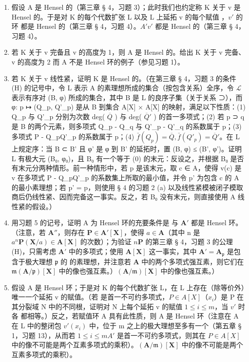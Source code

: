 \begin{enumerate}
\def\labelenumi{(\alph{enumi})}
\item
  假设 A 是 Hensel 的（第三章 § 4，习题 3）；此时我们也约定称 K 关于 v 是 Hensel 的。于是对 K 的每个代数扩张 L 以及 L 上延拓 v 的每个赋值 ，\(v'\) 的环  都是 Hensel 的（第三章 § 4，习题 4）。\(A'\)\(v'\) 都是 Hensel 的（第三章 § 4，习题 4）。
\item
  若 K 关于 v 完备且 v 的高度为 1，则 A 是 Hensel 的。给出 K 关于 v 完备、v 的高度为 2 而 A 不是 Hensel 环的例子（参见习题 1）。
\item
  若 K 关于 v 线性紧，证明 K 是 Hensel 的。（在第三章 § 4，习题 3 的条件 (H) 的记号中，令 L 表示 A 的素理想所成的集合（按包含关系）全序，令 \(\mathcal{L}\) 表示有序对 (B, φ) 所成的集合，其中 B 是 L 的良序子集（关于关系 ⊃），而 φ: p ↦ (Q\_p, Q'\_p) 是从 B 到集合 A{[}X{]} × A{[}X{]} 的映射，满足以下性质：(1) Q\_p 与 Q'\_p 分别为次数 deg( \(\overline{Q}\) ) 与 deg( \(\overline{Q}'\) ) 的首一多项式；(2) 若 p ⊃ q 是 B 的两个元素，则多项式 Q\_p - Q\_q 与 Q'\_p - Q'\_q 的系数属于 p；(3) 多项式 P - Q\_pQ'\_p 的系数属于 p；(4) \(\bar{f}(Q_{p}) = \overline{Q}, \bar{f}(Q'_{p}) = \overline{Q}'\)。在 L 上规定序：当 B ⊂ B' 且 φ' 是 φ 到 B' 的延拓时，置 (B, φ) ≤ (B', φ')。证明 L 有极大元 (B₀, φ₀)，且 B₀ 有一个等于 (0) 的末元：反设之，并根据 B₀ 是否有末元分两种情形。前一种情形中，若 p 是该末元，取 c ∈ A，使得 v(c) 是 v 在多项式 P - Q\_pQ'\_p 的系数集上所取的最小值，并令 p' 为包含 c 的 A 的最小素理想；若 p' = p，则使用 § 4 的习题 2 (a) 以及线性紧模被闭子模取商后仍线性紧、因而完备这一事实。反之，若 B₀ 没有末元，则直接使用 A 线性紧的假设。） 
\item
  用习题 5 的记号，证明 A 为 Hensel 环的充要条件是  与 \(\mathbf{A}'\) 都是 Hensel 环。（注意，若 \(\mathbf{A}''\)，则存在 \(\mathbf{P} \in \mathbf{A}'[\mathbf{X}]\)，使得 \(a \in \mathbf{A}\)（其中 n 是 \(a^n\mathbf{P}(\mathbf{X}/a) \in \mathbf{A}[\mathbf{X}]\) 的次数）；为验证 \(n\)\(\mathbf{P}\) 的第三章 § 4，习题 3 的公理 (H)，只需考虑 \(\mathbf{A}'\) 中的多项式；使用 \(\mathbf{A}[\mathbf{X}]\) 这一事实，其中 \(\mathbf{A}' = \mathbf{A}_{\mathfrak{p}}\) 是包含于极大理想 \(\mathfrak{p}\) 的  的素理想，并注意若 \(\mathbf{A}\) 中的两个多项式强互素，则它们在 \(\mathfrak{m}\)\((\mathbf{A}/\mathfrak{p})[\mathbf{X}]\) 中的像也强互素。）\((\mathbf{A}/\mathfrak{m})[\mathbf{X}]\) 中的像也强互素。）
\item
  假设 A 是 Hensel 环；于是对 K 的每个代数扩张 L，在 L 上存在（除等价外）唯一一个延拓 v 的赋值。（若  是首一不可约多项式，\(P \in A[X]\)（\(x_{i}\)）是 P 在其分裂域 N 中的不同根，证明对 N 上每个延拓 v 的赋值 \(1 \leqslant i \leqslant m\)，当 \(v'\) 时各  都相等。）反之，若赋值环 A 具有此性质，则 A 是 Hensel 环（注意在 A 在 L 中的整闭包 \(v'(x_{i})\) 中，位于 m 之上的极大理想至多有一个（第五章 § 1，习题 13），从而若 \(1 \leqslant i \leqslant m\)\(A'\) 是首一不可约多项式，则其在 \(P \in A[X]\) 中的像不可能是两个互素多项式的乘积）。\((\mathbf{A}/\mathfrak{m})[\mathbf{X}]\) 中的像不可能是两个互素多项式的乘积）。
\end{enumerate}


